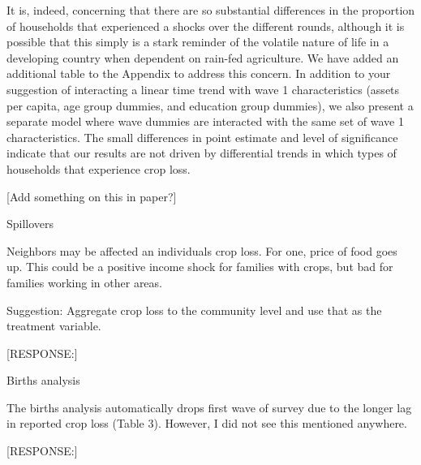 \documentclass[letterpaper,12pt]{article}
\begin{document}
\begin{description}
It is, indeed, concerning that there are so substantial
differences in the proportion of households that experienced a 
shocks over the different rounds, although it is possible that
this simply is a stark reminder of the volatile nature of life
in a developing country when dependent on rain-fed agriculture.
We have added an additional table to the Appendix to address this
concern. In addition to your suggestion of interacting a linear
time trend with wave 1 characteristics (assets per capita,
age group dummies, and education group dummies), we also present
a separate model where wave dummies are interacted with the
same set of wave 1 characteristics.
The small differences in point estimate and level of significance 
indicate that our results are not driven by differential trends
in which types of households that experience crop loss.

[Add something on this in paper?]


\item Spillovers

Neighbors may be affected an individuals crop loss. For one, price of
food goes up. This could be a positive income shock for families with
crops, but bad for families working in other areas.

Suggestion: Aggregate crop loss to the community level and use that as
the treatment variable.


[RESPONSE:]


\item Births analysis

The births analysis automatically drops first wave of survey due to the
longer lag in reported crop loss (Table 3). However, I did not see this
mentioned anywhere.

[RESPONSE:]


\end{description}


\newpage


\end{document}
